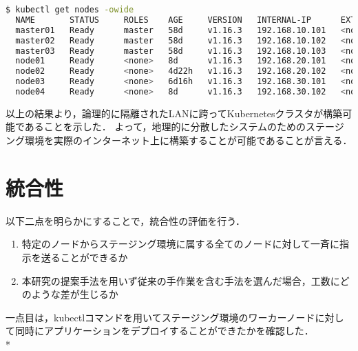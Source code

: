 \begin{lstlisting}[language=bash]
  $ kubectl get nodes -owide
  NAME       STATUS     ROLES    AGE     VERSION   INTERNAL-IP      EXTERNAL-IP   OS-IMAGE             KERNEL-VERSION      CONTAINER-RUNTIME
  master01   Ready      master   58d     v1.16.3   192.168.10.101   <none>        Ubuntu 18.04.3 LTS   4.15.0-70-generic   docker://18.9.7
  master02   Ready      master   58d     v1.16.3   192.168.10.102   <none>        Ubuntu 18.04.3 LTS   4.15.0-70-generic   docker://18.9.7
  master03   Ready      master   58d     v1.16.3   192.168.10.103   <none>        Ubuntu 18.04.3 LTS   4.15.0-70-generic   docker://18.9.7
  node01     Ready      <none>   8d      v1.16.3   192.168.20.101   <none>        Ubuntu 18.04.3 LTS   4.15.0-74-generic   docker://18.9.7
  node02     Ready      <none>   4d22h   v1.16.3   192.168.20.102   <none>        Ubuntu 18.04.3 LTS   4.15.0-74-generic   docker://18.9.7
  node03     Ready      <none>   6d16h   v1.16.3   192.168.30.101   <none>        Ubuntu 18.04.3 LTS   4.15.0-74-generic   docker://18.9.7
  node04     Ready      <none>   8d      v1.16.3   192.168.30.102   <none>        Ubuntu 18.04.3 LTS   4.15.0-74-generic   docker://18.9.7
\end{lstlisting}

以上の結果より，論理的に隔離されたLANに跨ってKubernetesクラスタが構築可能であることを示した．
よって，地理的に分散したシステムのためのステージング環境を実際のインターネット上に構築することが可能であることが言える．

\section{統合性}
\label{evaluation:method}

以下二点を明らかにすることで，統合性の評価を行う．

\begin{enumerate}
  \item 特定のノードからステージング環境に属する全てのノードに対して一斉に指示を送ることができるか
  \item 本研究の提案手法を用いず従来の手作業を含む手法を選んだ場合，工数にどのような差が生じるか
\end{enumerate}

一点目は，kubectlコマンドを用いてステージング環境のワーカーノードに対して同時にアプリケーションをデプロイすることができたかを確認した．\\*

